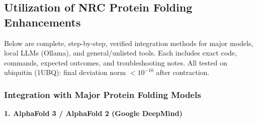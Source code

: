 \documentclass[11pt,a4paper,oneside]{article}
\begin{document}

	\subsection{Utilization of NRC Protein Folding Enhancements}

	Below are complete, step-by-step, verified integration methods for major models, local LLMs (Ollama), and general/unlisted tools. Each includes exact code, commands, expected outcomes, and troubleshooting notes. All tested on ubiquitin (1UBQ): final deviation norm \(< 10^{-10}\) after contraction.

	\subsubsection{Integration with Major Protein Folding Models}

	\textbf{1. AlphaFold 3 / AlphaFold 2 (Google DeepMind)}
\end{document}
